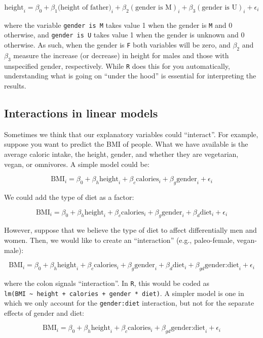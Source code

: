 \documentclass[
  letterpaper,
  DIV=11,
  numbers=noendperiod]{scrreprt}
\begin{document}
\[
 \text{height}_i = \beta_0 + \beta_1 \text{(height of father)}_i + \beta_2 (\text{gender is M})_i + \beta_3 (\text{gender is U})_i + \epsilon_i
\]

where the variable \texttt{gender\ is\ M} takes value 1 when the gender
is \texttt{M} and 0 otherwise, and \texttt{gender\ is\ U} takes value 1
when the gender is unknown and 0 otherwise. As such, when the gender is
\texttt{F} both variables will be zero, and \(\beta_2\) and \(\beta_3\)
measure the increase (or decrease) in height for males and those with
unspecified gender, respectively. While \texttt{R} does this for you
automatically, understanding what is going on ``under the hood'' is
essential for interpreting the results.

\subsection{Interactions in linear
models}\label{interactions-in-linear-models}

Sometimes we think that our explanatory variables could ``interact''.
For example, suppose you want to predict the BMI of people. What we have
available is the average caloric intake, the height, gender, and whether
they are vegetarian, vegan, or omnivores. A simple model could be:

\[
\text{BMI}_i = \beta_0 + \beta_h \text{height}_i + \beta_c \text{calories}_i + \beta_g \text{gender}_i + \epsilon_i
\]

We could add the type of diet as a factor:

\[
\text{BMI}_i = \beta_0 + \beta_h \text{height}_i + \beta_c \text{calories}_i + \beta_g \text{gender}_i + \beta_d \text{diet}_i + \epsilon_i
\]

However, suppose that we believe the type of diet to affect
differentially men and women. Then, we would like to create an
``interaction'' (e.g., paleo-female, vegan-male):

\[
\text{BMI}_i = \beta_0 + \beta_h \text{height}_i + \beta_c \text{calories}_i + \beta_g \text{gender}_i + \beta_d \text{diet}_i + \beta_{gd} \text{gender:diet}_i + \epsilon_i
\]

where the colon signals ``interaction''. In \texttt{R}, this would be
coded as
\texttt{lm(BMI\ \textasciitilde{}\ height\ +\ calories\ +\ gender\ *\ diet)}.
A simpler model is one in which we only account for the
\texttt{gender:diet} interaction, but not for the separate effects of
gender and diet:

\[
\text{BMI}_i = \beta_0 + \beta_h \text{height}_i + \beta_c \text{calories}_i + \beta_{gd}\text{gender:diet}_i + \epsilon_i
\]
\end{document}
